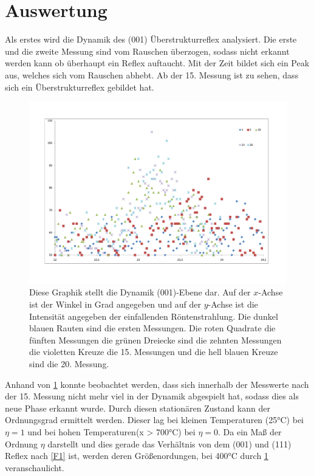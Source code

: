\section{Auswertung}
Als erstes wird die Dynamik des (001) Überstrukturreflex analysiert. Die erste und die zweite Messung sind vom Rauschen überzogen, sodass nicht erkannt werden kann ob überhaupt ein Reflex auftaucht. Mit der Zeit bildet sich ein Peak aus, welches sich vom Rauschen abhebt. Ab der 15. Messung ist zu sehen, dass sich ein Überstrukturreflex gebildet hat.
\begin{figure}[h!]
    \centering
    \includegraphics[scale = 0.6]{Bragg.pdf}
    \caption{Diese Graphik stellt die Dynamik (001)-Ebene dar. Auf der $x$-Achse ist der Winkel in Grad angegeben und auf der $y$-Achse ist die Intensität angegeben der einfallenden Röntenstrahlung. Die dunkel blauen Rauten sind die ersten Messungen. Die roten Quadrate die fünften Messungen die grünen Dreiecke sind die zehnten Messungen die violetten Kreuze die 15. Messungen und die hell blauen Kreuze sind die 20. Messung.}
    \label{A3}
\end{figure}
Anhand von \cref{A3} konnte beobachtet werden, dass sich innerhalb der Messwerte nach der 15. Messung nicht mehr viel in der Dynamik abgespielt hat, sodass dies als neue Phase erkannt wurde. Durch diesen stationären Zustand kann der Ordnungsgrad ermittelt werden. Dieser lag bei kleinen Temperaturen (25°C) bei $\eta = 1$ und bei hohen Temperaturen(x > 700°C) bei $\eta = 0$. Da ein Maß der Ordnung $\eta$ darstellt und dies gerade das Verhältnis von dem (001) und (111) Reflex nach \cref{F1} ist, werden deren Größenordungen, bei 400°C durch \cref{A3} veranschaulicht.
